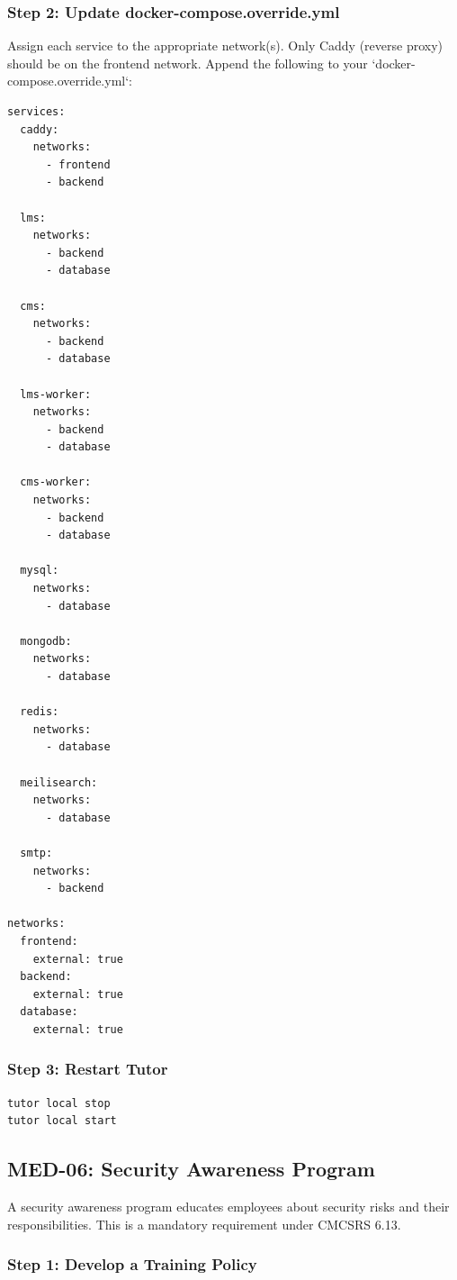 \subsubsection{Step 2: Update docker-compose.override.yml}

Assign each service to the appropriate network(s). Only Caddy (reverse proxy) should be on the frontend network. Append the following to your `docker-compose.override.yml`:

\begin{lstlisting}[caption={Network segmentation configuration}]
services:
  caddy:
    networks:
      - frontend
      - backend

  lms:
    networks:
      - backend
      - database

  cms:
    networks:
      - backend
      - database

  lms-worker:
    networks:
      - backend
      - database

  cms-worker:
    networks:
      - backend
      - database

  mysql:
    networks:
      - database

  mongodb:
    networks:
      - database

  redis:
    networks:
      - database

  meilisearch:
    networks:
      - database

  smtp:
    networks:
      - backend

networks:
  frontend:
    external: true
  backend:
    external: true
  database:
    external: true
\end{lstlisting}

\subsubsection{Step 3: Restart Tutor}

\begin{lstlisting}[language=bash]
tutor local stop
tutor local start
\end{lstlisting}

\subsection{MED-06: Security Awareness Program}

A security awareness program educates employees about security risks and their responsibilities. This is a mandatory requirement under CMCSRS 6.13.

\subsubsection{Step 1: Develop a Training Policy}

